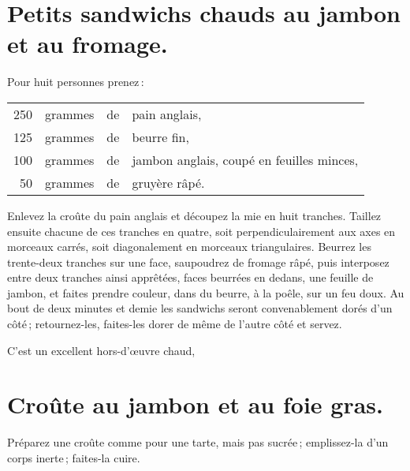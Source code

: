 \section*{\centering Petits sandwichs chauds au jambon et au fromage.}
{}

Pour huit personnes prenez :

\medskip

\footnotesize
\begin{longtable}{rrrp{16em}}
    250 & grammes & de & pain anglais,                                                                    \\
    125 & grammes & de & beurre fin,                                                                      \\
    100 & grammes & de & jambon anglais, coupé en feuilles minces,                                        \\
     50 & grammes & de & gruyère râpé.                                                                    \\
\end{longtable}
\normalsize

Enlevez la croûte du pain anglais et découpez la mie en huit tranches. Taillez
ensuite chacune de ces tranches en quatre, soit perpendiculairement aux axes en
morceaux carrés, soit diagonalement en morceaux triangulaires. Beurrez les
trente-deux tranches sur une face, saupoudrez de fromage râpé, puis interposez
entre deux tranches ainsi apprêtées, faces beurrées en dedans, une feuille de
jambon, et faites prendre couleur, dans du beurre, à la poêle, sur un feu doux.
Au bout de deux minutes et demie les sandwichs seront convenablement dorés d'un
côté ; retournez-les, faites-les dorer de même de l'autre côté et servez.

C'est un excellent hors-d'œuvre chaud,

\section*{\centering Croûte au jambon et au foie gras.}
{}

Préparez une croûte comme pour une tarte, mais pas sucrée ; emplissez-la
d'un corps inerte ; faites-la cuire.

